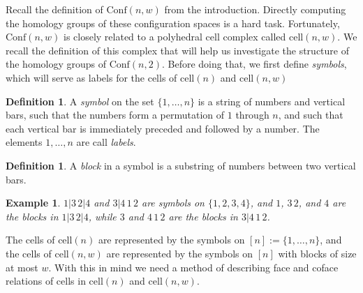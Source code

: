 \documentclass[12py]{amsart}%
\newtheorem{exam}[thm]{Example}
\theoremstyle{definition}\newtheorem{definition}[thm]{Definition}
\theoremstyle{definition}
\newtheorem{defn}[thm]{Definition}
\newcommand{\R}{\ensuremath{\mathbb{R}}}
\begin{document}
Recall the definition of $\text{Conf}(n,w)$ from the introduction. Directly
computing the homology groups of these configuration spaces is a hard task. Fortunately, $\text{Conf}(n,w)$ is closely related to a polyhedral cell complex called $\text{cell}(n,w)$. We recall the definition of this complex that will help us investigate the structure of the homology groups of $\text{Conf}(n,2)$. Before doing that, we first define \emph{symbols}, which will serve as labels for the cells of $\text{cell}(n)$ and $\text{cell}(n,w)$

\begin{defn}
A \emph{symbol} on the set $\{1,\dots, n\}$ is a string of numbers and vertical bars, such that the numbers form a permutation of $1$ through $n$, and such that each vertical bar is immediately preceded and followed by a number. The elements $1,\dots, n$ are call \emph{labels}.
\end{defn}

\begin{defn}
A \emph{block} in a symbol is a substring of numbers between two vertical bars.
\end{defn}

\begin{exam}
$1|3\,2|4$ and $3|4\,1\,2$ are symbols on $\{1,2,3,4\}$, and $1$, $3\,2$, and $4$ are the blocks in $1|3\,2|4$, while $3$ and $4\,1\,2$ are the blocks in $3|4\,1\,2$.
\end{exam}

The cells of $\text{cell}(n)$ are represented by the symbols on $[n]:=\{1, \dots, n\}$, and the cells of $\text{cell}(n,w)$ are represented by the symbols on $[n]$ with blocks of size at most $w$. With this in mind we need a method of describing face and coface relations of cells in $\text{cell}(n)$ and $\text{cell}(n,w)$.
\end{document}
